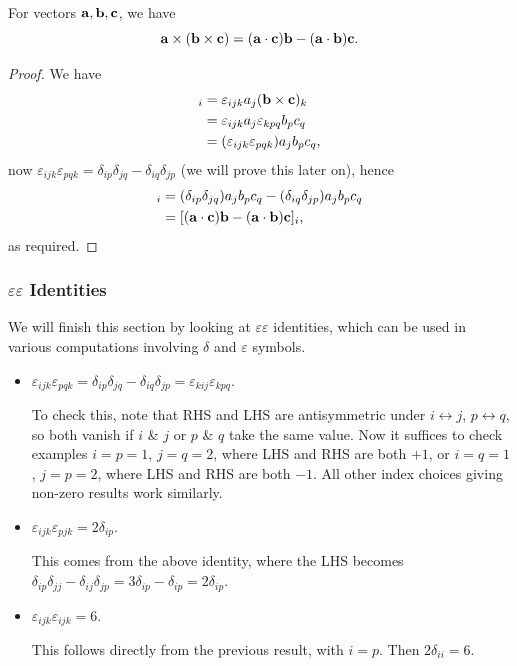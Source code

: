 \documentclass[a4paper]{scrartcl}
\begin{document}
\begin{proposition}
    For vectors $\mathbf{a}, \mathbf{b}, \mathbf{c}$, we have
    $$
    \mathbf{a} \times(\mathbf{b} \times \mathbf{c})=(\mathbf{a} \cdot \mathbf{c}) \mathbf{b}-(\mathbf{a} \cdot \mathbf{b}) \mathbf{c}.
    $$
\end{proposition}
\begin{proof}
We have
\begin{align*}
    [\vv{a} \times (\vv{b} \times \vv{c})]_i &= \varepsilon_{ijk} a_j (\vv{b} \times \vv{c})_k \\
        &= \varepsilon_{ijk} a_j \varepsilon_{kpq} b_p c_q \\
 &= (\varepsilon_{ijk}\varepsilon_{pqk}) a_j b_p c_q,
\end{align*}    
now $\varepsilon_{ijk}\varepsilon_{pqk} = \delta_{ip} \delta_{jq} - \delta_{iq} \delta_{jp}$ (we will prove this later on), hence
\begin{align*}
    [\vv{a} \times (\vv{b} \times \vv{c})]_i &= (\delta_{ip} \delta_{jq})a_j b_p c_q - (\delta_{iq} \delta_{jp}) a_j b_p c_q \\
    &= [(\vv{a} \cdot \vv{c})\vv{b} - (\vv{a} \cdot \vv{b})\vv{c}]_i,
\end{align*}
as required.
\end{proof}

\subsubsection{$\varepsilon \varepsilon$ Identities}

We will finish this section by looking at $\varepsilon \varepsilon$ identities, which can be used in various computations involving $\delta$ and $\varepsilon$ symbols.

\begin{itemize}
    \item $\varepsilon_{ijk}\varepsilon_{pqk} = \delta_{ip} \delta_{jq} - \delta_{iq} \delta_{jp} = \varepsilon_{kij} \varepsilon_{kpq}$.
    
    To check this, note that RHS and LHS are antisymmetric under $i \leftrightarrow j$, $p \leftrightarrow q$, so both vanish if $i$ \& $j$ or $p$ \& $q$ take the same value. Now it suffices to check examples $i = p = 1$, $j = q = 2$, where LHS and RHS are both $+1$, or $i = q = 1$, $j = p = 2$, where LHS and RHS are both $-1$. All other index choices giving non-zero results work similarly.

    \item $\varepsilon_{ijk} \varepsilon_{pjk} = 2 \delta_{ip}$.
    
    This comes from the above identity, where the LHS becomes $\delta_{ip} \delta_{jj} - \delta_{ij} \delta_{jp} = 3\delta_{ip} - \delta_{ip} = 2\delta_{ip}$.

    \item $\varepsilon_{ijk} \varepsilon_{ijk} = 6$.

    This follows directly from the previous result, with $i = p$. Then $2 \delta_{ii} = 6$.
\end{itemize}
\end{document}
